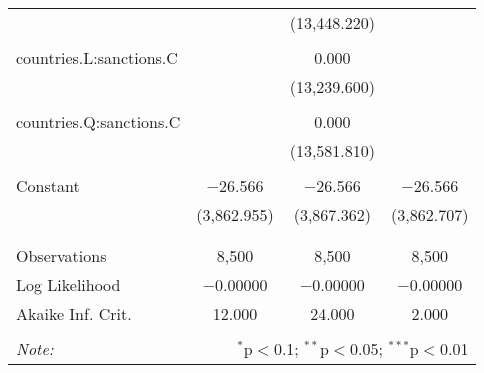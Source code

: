 \begin{table}[!htbp]
\begin{tabular}{@{\extracolsep{5pt}}lccc}
  &  & (13,448.220) &  \\ 
  & & & \\ 
 countries.L:sanctions.C &  & 0.000 &  \\ 
  &  & (13,239.600) &  \\ 
  & & & \\ 
 countries.Q:sanctions.C &  & 0.000 &  \\ 
  &  & (13,581.810) &  \\ 
  & & & \\ 
 Constant & $-$26.566 & $-$26.566 & $-$26.566 \\ 
  & (3,862.955) & (3,867.362) & (3,862.707) \\ 
  & & & \\ 
\hline \\[-1.8ex] 
Observations & 8,500 & 8,500 & 8,500 \\ 
Log Likelihood & $-$0.00000 & $-$0.00000 & $-$0.00000 \\ 
Akaike Inf. Crit. & 12.000 & 24.000 & 2.000 \\ 
\hline 
\hline \\[-1.8ex] 
\textit{Note:}  & \multicolumn{3}{r}{$^{*}$p$<$0.1; $^{**}$p$<$0.05; $^{***}$p$<$0.01} \\ 
\end{tabular} 
\end{table}  
